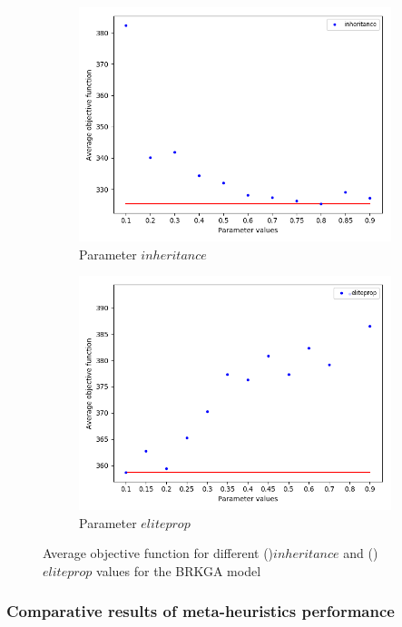 \begin{figure}[H]
\begin{subfigure}[b]{.49\linewidth}
\centering
\includegraphics[width=0.8\linewidth]{./img/best-inheritance.png}
\caption{Parameter $inheritance$ }\label{fig2c}
\end{subfigure}%
\begin{subfigure}[b]{.49\linewidth}
\centering
\includegraphics[width=0.8\linewidth]{./img/best-eliteprop.png}
\caption{Parameter $eliteprop$ }\label{fig2d}
\end{subfigure}\vfill
\caption{Average objective function for different ()$inheritance$ and () $eliteprop$ values for the BRKGA model }
\label{fig_brkga_params}
\end{figure}







\subsubsection{Comparative results of meta-heuristics performance}


